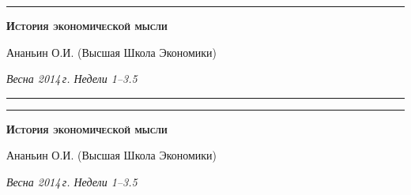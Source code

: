 \documentclass[a4paper]{article}
\begin{document}
\Large

\begin{center}
\hrule
\medskip

\textbf{\textsc{История экономической мысли}}
\smallskip

{\large\textrm{Ананьин О.И. (Высшая Школа Экономики)}}

\smallskip

\textsl{Весна 2014\,г. Недели 1--3.5}
\end{center}

\hrule
\newpage


\begin{center}
\hrule
\medskip

\textbf{\textsc{История экономической мысли}}
\smallskip

{\large\textrm{Ананьин О.И. (Высшая Школа Экономики)}}

\smallskip

\textsl{Весна 2014\,г. Недели 1--3.5}
\end{center}

\large
\end{document}

